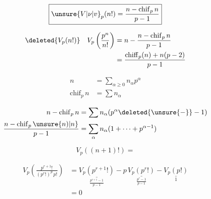 
\[
\boxed{\unsure{V|\nu|v}_p(n!)=\frac{n-\mathrm{chif}_p\,n}{p-1}}
\]

\[
\begin{aligned}
\deleted{V_p(n!)}\quad V_p\left(\frac{p^n}{n!}\right)&=n-\frac{n-\mathrm{chif}_p\,n}{p-1}\\
&=\frac{\mathrm{chiff}_p(n)+n(p-2)}{p-1}
\end{aligned}
\]

\[
\begin{aligned}
n&=\sum_{\alpha\geq 0}n_\alpha p^\alpha\\
\mathrm{chif}_p\,n&=\sum n_\alpha
\end{aligned}
\]

\[
\begin{aligned}
n-\mathrm{chif}_p\,n&=\sum n_\alpha(p^\alpha\deleted{\unsure{-}}-1)\\
\frac{n-\mathrm{chif}_p\,\unsure{n)|n}}{p-1}&=\sum_\alpha n_\alpha(1+\cdots+p^{\alpha-1})
\end{aligned}
\]

\[
V_p((n+1)!)=
\]

\[
\begin{aligned}
V_p\left(\frac{p^{r+1}!}{(p^r!)^p\,p!}\right)
&=\underset{\frac{p^{r+1}-1}{p-1}}{\underline{V_p(p^{r+1}!)}}-p\,\underset{\frac{p^r-1}{p-1}}{\underline{V_p(p^r!)}}-\underset{1}{\underline{V_p(p!)}}\\
&=0
\end{aligned}
\]

